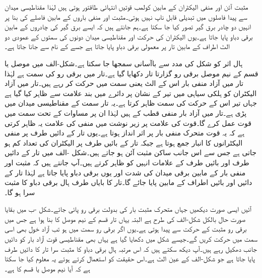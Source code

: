مثبت آئن اور منفی الیکٹران کے مابین کولمب قوتیں انتہائی طاقتور ہوتی ہیں لہٰذا مقناطیسی میدان سے پیدا فاصلوں میں تبدیلی قابل ناپ نہیں ہوتی۔مثبت اور منفی باروں کے مابین فاصلے کی بنا پر انہیں دو چادر برق گیر  تصور کیا جا سکتا ہے۔ہم جانتے ہیں کہ ایسے برق گیر  کی چادروں کے مابین برقی دباو پایا جاتا ہے۔یوں الیکٹران کی حرکت اور مقناطیسی میدان دونوں کی سمتوں کے عمودی دو الٹ اطراف کے مابین تار پر معمولی برقی دباو پایا جاتا ہے جسے  کے نام سے جانا جاتا ہے۔

ہال اثر کو شکل  کی مدد سے باآسانی سمجھا جا سکتا ہے۔شکل-الف میں موصل یا  قسم کے نیم موصل برقی رو گزارتا تار دکھایا گیا ہے۔تار میں برقی رو  کی سمت  ہے  لہٰذا تار میں آزاد منفی بار اس کے الٹ یعنی  سمت  میں حرکت کر رہے ہیں۔تار میں آزاد الیکٹران کو ہلکی سیاہی میں تیر کے نشان پر دائرے میں بند  علامت سے ظاہر کیا گیا ہے جہاں تیر اس کے حرکت کی سمت ظاہر کرتا ہے۔یہ تار  سمت کے مقناطیسی میدان میں پڑی ہے۔تار میں آزاد بار منفی قطب کے ہیں لہٰذا ان پر مساوات  کے تحت  سمت میں قوت  عمل کرے گا۔قوت کی علامت پر زیر نوشت میں منفی کی علامت یہ ظاہر کرتی ہے کہ یہ قوت متحرک منفی بار پر اثر انداز ہوتا ہے۔یوں تار کے دائیں طرف پر منفی الیکٹرانوں کا انبار جمع ہوتا ہے جبکہ تار کے بائیں طرف پر الیکٹران کی تعداد کم ہو جاتی ہے جس سے اس جانب ساکن مثبت آئن  ہو جاتے ہیں۔شکل -الف میں تار کے دائیں طرف  اور بائیں طرف   کے علامات انہیں کو ظاہر کرتے ہیں۔آپ جانتے ہیں کہ مثبت اور  منفی بار  کے مابین برقی میدان کی شدت  اور یوں برقی دباو پایا جاتا ہے لہٰذا تار کے دائیں اور بائیں اطراف کے مابین  پایا جائے گا۔تار کا بایاں طرف ہال برقی دباو کا مثبت سرا ہو گا۔

آئیں ایسی صورت دیکھیں جہاں متحرک مثبت بار کی بدولت برقی رو پائی جائے۔شکل -ب میں بقایا صورت حال بالکل شکل-الف کی طرح ہے البتہ یہاں تار  قسم کے نیم موصل کا بنا ہوا ہے جس میں برقی رو مثبت  کے حرکت سے پیدا ہوتی ہے۔یوں اگر برقی رو  سمت میں ہو تب آزاد خول بھی اسی سمت میں حرکت کریں گے۔جیسے شکل میں دکھایا گیا ہے یہاں بھی مقناطیسی قوت آزاد بار کو دائیں جانب دھکیل رہے ہیں۔آپ دیکھ سکتے ہیں کہ اس مرتبہ ہال برقی دباو کا مثبت سرا تار کا دائیں طرف پایا جاتا ہے جو شکل-الف کے عین الٹ ہے۔اس حقیقت کو استعمال کرتے ہوئے یہ معلوم کیا جا سکتا ہے کہ آیا  نیم موصل  یا  قسم کا ہے۔

